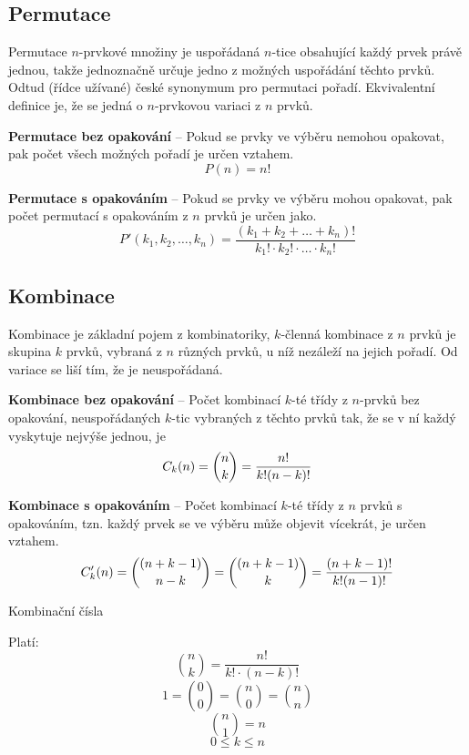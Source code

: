 \subsection{Permutace}

\begin{compactitem}
    \item Permutace $n$-prvkové množiny je uspořádaná $n$-tice obsahující každý prvek právě jednou, takže jednoznačně určuje jedno z možných uspořádání těchto prvků. Odtud (řídce užívané) české synonymum pro permutaci pořadí. Ekvivalentní definice je, že se jedná o $n$-prvkovou variaci z $n$ prvků.

    \item \textbf{Permutace bez opakování} -- Pokud se prvky ve výběru nemohou opakovat, pak počet všech možných pořadí je určen vztahem.
    $$ P(n) = n! $$

    \item \textbf{Permutace s opakováním} -- Pokud se prvky ve výběru mohou opakovat, pak počet permutací s opakováním z $n$ prvků je určen jako.
    $$ P'{(k_1,k_2,\ldots,k_n)} = \frac {(k_1+k_2+\ldots+k_n)!}{{k_1!}\cdot{k_2!}\cdot\ldots\cdot{k_n!}} $$
\end{compactitem}

\subsection{Kombinace}

\begin{compactitem}
    \item Kombinace je základní pojem z kombinatoriky, $k$-členná kombinace z $n$ prvků je skupina $k$ prvků, vybraná z $n$ různých prvků, u níž nezáleží na jejich pořadí. Od variace se liší tím, že je neuspořádaná.

    \item \textbf{Kombinace bez opakování} -- Počet kombinací $k$-té třídy z $n$-prvků bez opakování, neuspořádaných $k$-tic vybraných z těchto prvků tak, že se v ní každý vyskytuje nejvýše jednou, je
    $$ {\displaystyle C_{k}(n)={n \choose k}={n! \over k!(n-k)!}} $$

    \item \textbf{Kombinace s opakováním} -- Počet kombinací $k$-té třídy z $n$ prvků s opakováním, tzn. každý prvek se ve výběru může objevit vícekrát, je určen vztahem.
    $$ {\displaystyle C_{k}^{\prime }(n)={{(n+k-1)} \choose n-k}={{(n+k-1)} \choose k}={(n+k-1)! \over k!(n-1)!}}$$

    \item Kombinační čísla \begin{compactitem}
        \item Platí:
        $$ {n \choose k} = \frac{n!}{k! \cdot (n-k)!} $$
        $$ 1 = {0 \choose 0} = {n \choose 0} = {n \choose n} $$
        $$ {n \choose 1} = n$$
        $$ 0 \leq k \leq n$$
    \end{compactitem}
\end{compactitem}

